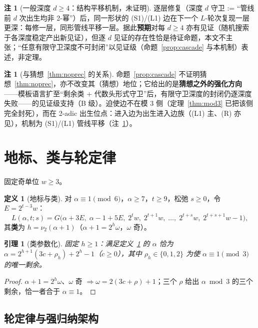 \documentclass[11pt]{ctexart}
\newtheorem{lemma}[theorem]{引理}
\theoremstyle{definition}
\newtheorem{definition}[theorem]{定义}
\newtheorem{remark}[theorem]{注}
\newcommand{\vtwo}[1]{\nu_2(#1)}
\begin{document}
\begin{remark}[一般深度 $d\ge4$：结构平移机制，未证明]\label{rem:translate}
逐层修复（深度 $d$ 守卫 := ``管线前 $d$ 次出生均非 2-幂''）后，同一形状的 (S1)/(L1) 边在下一个 $L$-轮次复现一层更深：每修一层，同形管线平移一层。据此\textbf{预期}对每 $d\ge4$ 亦有见证（随机搜索于各深度稳定产出新见证），但逐 $d$ 见证的存在性恰是待证命题，本文不主张；``任意有限守卫深度不可封闭''以见证级（命题~\ref{prop:cascade} 与本机制）表述，非定理。
\end{remark}

\begin{remark}[与猜想~\ref{thm:noprec} 的关系]\label{rem:noprec2}
命题~\ref{prop:cascade} 不证明猜想~\ref{thm:noprec}，亦不改变其（猜想）地位；它给出的是\textbf{猜想之外的强化方向}——模板语言扩至``剩余类 $+$ 代数头形式守卫''后，有限守卫深度的封闭仍逐深度失败——的见证级支持（B 级）。迫使边不在模 3 侧（定理~\ref{thm:mod3} 已把该侧完全封死），而在 2-adic 出生位点：进入边为出生进入边族（(L1) 主、(R) 亦见），机制为 (S1)/(L1) 管线平移（注~\ref{rem:translate}）。
\end{remark}

\section{地标、类与轮定律}

固定奇单位 $w\ge3$。

\begin{definition}[地标与类]\label{def:landmark}
对 $\alpha\equiv1\pmod6$，$\alpha\ge7$，$t\ge9$，松弛 $s\ge0$，令 $E=2^{t-3}w$：
\[
L(\alpha,t;s)=G\bigl(\alpha{+}3E,\;\alpha{-}1{+}5E,\;2^{t}w,\;2^{t+1}w,\;\dots,\;2^{t+s}w,\;2^{t+s+1}w{-}1\bigr),
\]
其\textbf{类}为 $h=\vtwo{\alpha+1}$（$\alpha{+}1=2^{h}\omega$，$\omega$ 奇）。
\end{definition}

\begin{lemma}[类参数化]\label{lem:param}
固定 $h\ge1$：满足定义~\ref{def:landmark} 的 $\alpha$ 恰为 $\alpha=2^{h+1}(3c+\rho_h)+2^{h}-1$（$c\ge0$），其中 $\rho_h\in\{0,1,2\}$ 为使 $\alpha\equiv1\pmod3$ 的唯一剩余。
\end{lemma}
\begin{proof}
$\alpha{+}1=2^h\omega$、$\omega$ 奇 $\Rightarrow\omega=2(3c{+}\rho){+}1$；三个 $\rho$ 给出 $\alpha\bmod3$ 的三个剩余，恰一者合于 $\alpha\equiv1$。
\end{proof}

\subsection*{轮定律与强归纳架构}
\end{document}
